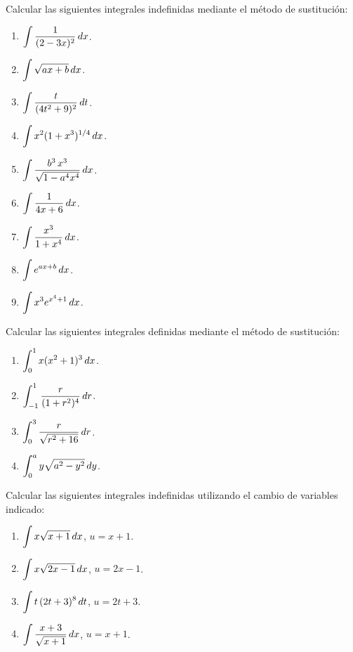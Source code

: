 \item Calcular las siguientes integrales indefinidas mediante el método de sustitución:

\begin{multicols}{2}
  \begin{enumerate}
    \item $\displaystyle \int \frac{1}{(2-3x)^2} \,dx$.
    \item $\displaystyle \int \sqrt{ax+b} \,dx$.
    \item $\displaystyle \int \frac{t}{(4t^2+9)^2} \,dt$.
    \item $\displaystyle \int x^2 (1+x^3)^{1/4} \,dx$.
    \item $\displaystyle \int \frac{b^3 \, x^3}{\sqrt{1-a^4x^4}} \,dx$.
    \item $\displaystyle \int \frac{1}{4x+6}\,dx$.
    \item $\displaystyle \int \frac{x^3}{1+x^4}\,dx$.
    \item $\displaystyle \int e^{ax+b}\,dx$.
    \item $\displaystyle \int x^3 e^{x^4+1}\,dx$.
  \end{enumerate}
\end{multicols}

\item Calcular las siguientes integrales definidas mediante el método de sustitución:

\begin{multicols}{2}
  \begin{enumerate}
    \item $\displaystyle \int_{0}^{1} x(x^2+1)^3 \,dx$.
    \item $\displaystyle \int_{-1}^{1} \frac{r}{(1+r^2)^4} \,dr$.
    \item $\displaystyle \int_{0}^{3} \frac{r}{\sqrt{r^2+16}}  \,dr$.
    \item $\displaystyle \int_{0}^{a} y\sqrt{a^2-y^2} \,dy$.
  \end{enumerate}
\end{multicols}

\item Calcular las siguientes integrales indefinidas utilizando el cambio de variables indicado:

\begin{multicols}{2}
  \begin{enumerate}
    \item $\displaystyle \int x \sqrt{x+1} \,dx $, $u = x+1$.
    \item $\displaystyle \int x \sqrt{2x-1} \,dx $, $u = 2x-1$.
    \item $\displaystyle \int t\,(2t+3)^8 \,dt $, $u = 2t+3$.
    \item $\displaystyle \int \frac{x+3}{\sqrt{x+1}}\,dx $, $u = x+1$.
  \end{enumerate}
\end{multicols}